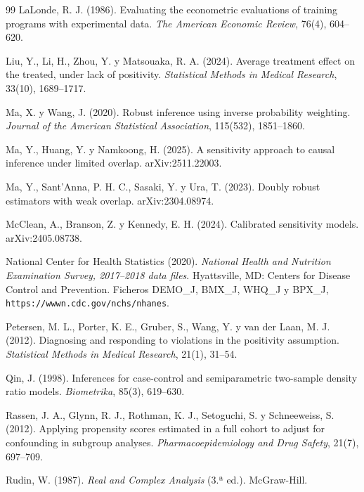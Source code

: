 \begin{thebibliography}{99}
 LaLonde, R. J. (1986). Evaluating the econometric evaluations of training programs with experimental data. \emph{The American Economic Review}, 76(4), 604--620.

 Liu, Y., Li, H., Zhou, Y. y Matsouaka, R. A. (2024). Average treatment effect on the treated, under lack of positivity. \emph{Statistical Methods in Medical Research}, 33(10), 1689--1717.

 Ma, X. y Wang, J. (2020). Robust inference using inverse probability weighting. \emph{Journal of the American Statistical Association}, 115(532), 1851--1860.

 Ma, Y., Huang, Y. y Namkoong, H. (2025). A sensitivity approach to causal inference under limited overlap. arXiv:2511.22003.

 Ma, Y., Sant'Anna, P. H. C., Sasaki, Y. y Ura, T. (2023). Doubly robust estimators with weak overlap. arXiv:2304.08974.

 McClean, A., Branson, Z. y Kennedy, E. H. (2024). Calibrated sensitivity models. arXiv:2405.08738.

 National Center for Health Statistics (2020). \emph{National Health and Nutrition Examination Survey, 2017--2018 data files}. Hyattsville, MD: Centers for Disease Control and Prevention. Ficheros DEMO\_J, BMX\_J, WHQ\_J y BPX\_J, \texttt{https://wwwn.cdc.gov/nchs/nhanes}.

 Petersen, M. L., Porter, K. E., Gruber, S., Wang, Y. y van der Laan, M. J. (2012). Diagnosing and responding to violations in the positivity assumption. \emph{Statistical Methods in Medical Research}, 21(1), 31--54.

 Qin, J. (1998). Inferences for case-control and semiparametric two-sample density ratio models. \emph{Biometrika}, 85(3), 619--630.

 Rassen, J. A., Glynn, R. J., Rothman, K. J., Setoguchi, S. y Schneeweiss, S. (2012). Applying propensity scores estimated in a full cohort to adjust for confounding in subgroup analyses. \emph{Pharmacoepidemiology and Drug Safety}, 21(7), 697--709.

 Rudin, W. (1987). \emph{Real and Complex Analysis} (3.ª ed.). McGraw-Hill.


\end{thebibliography}
